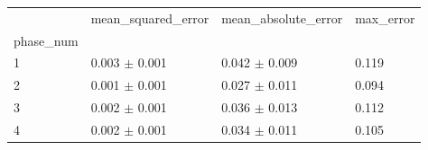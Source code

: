 \begin{tabular}{llll}
\toprule
 & mean_squared_error & mean_absolute_error & max_error \\
phase_num &  &  &  \\
\midrule
1 & 0.003 $\pm$ 0.001 & 0.042 $\pm$ 0.009 & 0.119 \\
2 & 0.001 $\pm$ 0.001 & 0.027 $\pm$ 0.011 & 0.094 \\
3 & 0.002 $\pm$ 0.001 & 0.036 $\pm$ 0.013 & 0.112 \\
4 & 0.002 $\pm$ 0.001 & 0.034 $\pm$ 0.011 & 0.105 \\
\bottomrule
\end{tabular}
